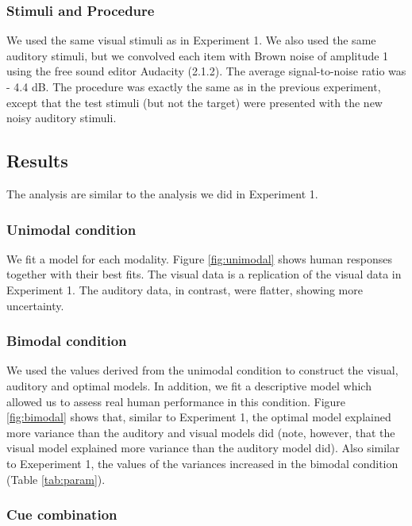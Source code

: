 \documentclass[english,,man,floatsintext]{apa6}
\theoremstyle{definition}
\theoremstyle{definition}
\theoremstyle{definition}
\theoremstyle{remark}
\begin{document}
\subsubsection{Stimuli and Procedure}\label{stimuli-and-procedure}

We used the same visual stimuli as in Experiment 1. We also used the
same auditory stimuli, but we convolved each item with Brown noise of
amplitude 1 using the free sound editor Audacity (2.1.2). The average
signal-to-noise ratio was - 4.4 dB. The procedure was exactly the same
as in the previous experiment, except that the test stimuli (but not the
target) were presented with the new noisy auditory stimuli.

\subsection{Results}\label{results}

The analysis are similar to the analysis we did in Experiment 1.

\subsubsection{Unimodal condition}\label{unimodal-condition}

We fit a model for each modality. Figure \ref{fig:unimodal} shows human
responses together with their best fits. The visual data is a
replication of the visual data in Experiment 1. The auditory data, in
contrast, were flatter, showing more uncertainty.

\subsubsection{Bimodal condition}\label{bimodal-condition-2}

We used the values derived from the unimodal condition to construct the
visual, auditory and optimal models. In addition, we fit a descriptive
model which allowed us to assess real human performance in this
condition. Figure \ref{fig:bimodal} shows that, similar to Experiment 1,
the optimal model explained more variance than the auditory and visual
models did (note, however, that the visual model explained more variance
than the auditory model did). Also similar to Exeperiment 1, the values
of the variances increased in the bimodal condition (Table
\ref{tab:param}).

\subsubsection{Cue combination}\label{cue-combination-1}
\end{document}
